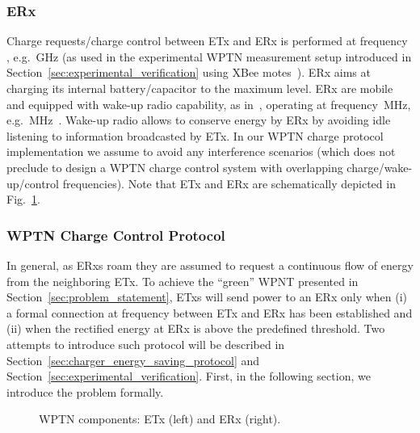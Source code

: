 \documentclass[11pt,draftclsnofoot,journal,onecolumn]{IEEEtran}
\begin{document}
\subsubsection{ERx}
\label{sec:erx}

Charge requests/charge control between ETx and ERx is performed at frequency , e.g. \,GHz (as used in the experimental WPTN measurement setup introduced in Section~\ref{sec:experimental_verification} using XBee motes~\cite{xbee_website}). ERx aims at charging its internal battery/capacitor to the maximum level. ERx are mobile and equipped with wake-up radio capability, as in~\cite[Sec. II]{holleman_biocas_2008}, operating at frequency \,MHz, e.g. \,MHz~\cite{wisp_website}. Wake-up radio allows to conserve energy by ERx by avoiding idle listening to information broadcasted by ETx. In our WPTN charge protocol implementation we assume  to avoid any interference scenarios (which does not preclude to design a WPTN charge control system with overlapping charge/wake-up/control frequencies). Note that ETx and ERx are schematically depicted in Fig.~\ref{fig:wptn_hardware_model}.

\subsubsection{WPTN Charge Control Protocol}
\label{sec:charge_request_protocol}

In general, as ERxs roam they are assumed to request a continuous flow of energy from the neighboring ETx. To achieve the ``green'' WPNT presented in Section~\ref{sec:problem_statement}, ETxs will send power to an ERx only when (i) a formal connection at frequency  between ETx and ERx has been established and (ii) when the rectified energy at ERx is above the predefined threshold. Two attempts to introduce such protocol will be described in Section~\ref{sec:charger_energy_saving_protocol} and Section~\ref{sec:experimental_verification}. First, in the following section, we introduce the problem formally.

\begin{figure}
\centering
{}
\caption{WPTN components: ETx (left) and ERx (right).}
\label{fig:wptn_hardware_model}
\end{figure}
\end{document}

